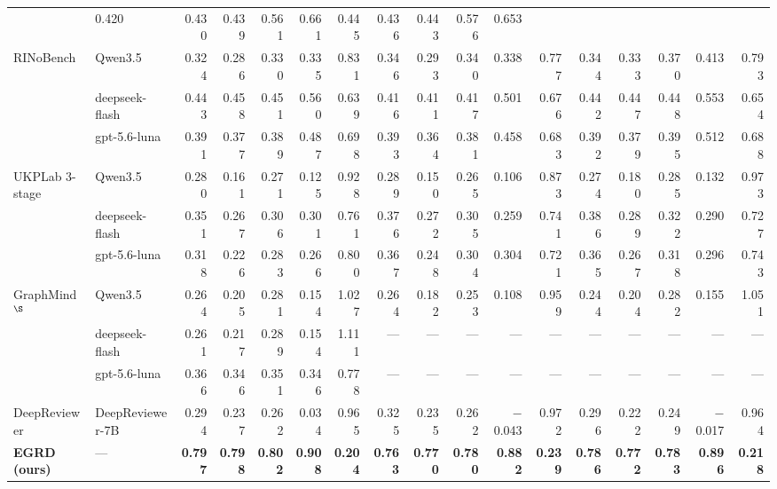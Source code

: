 \begin{table}[t]
{\begin{tabular}{@{}ll rrrrr rrrrr rrrrr@{}}
& 0.420 & 0.430 & 0.439 & 0.561 & 0.661
& 0.445 & 0.436 & 0.443 & 0.576 & 0.653 \\
\addlinespace
RINoBench & Qwen3.5
& 0.324 & 0.286 & 0.330 & 0.335 & 0.831
& 0.346 & 0.293 & 0.340 & 0.338 & 0.777
& 0.344 & 0.333 & 0.370 & 0.413 & 0.793 \\
& deepseek-flash
& 0.443 & 0.458 & 0.451 & 0.560 & 0.639
& 0.416 & 0.411 & 0.417 & 0.501 & 0.676
& 0.442 & 0.447 & 0.448 & 0.553 & 0.654 \\
& gpt-5.6-luna
& 0.391 & 0.377 & 0.389 & 0.487 & 0.698
& 0.393 & 0.364 & 0.381 & 0.458 & 0.683
& 0.392 & 0.379 & 0.395 & 0.512 & 0.688 \\
\addlinespace
UKPLab 3-stage & Qwen3.5
& 0.280 & 0.161 & 0.271 & 0.125 & 0.928
& 0.289 & 0.150 & 0.265 & 0.106 & 0.873
& 0.274 & 0.180 & 0.285 & 0.132 & 0.973 \\
& deepseek-flash
& 0.351 & 0.267 & 0.306 & 0.301 & 0.761
& 0.376 & 0.272 & 0.305 & 0.259 & 0.741
& 0.386 & 0.289 & 0.322 & 0.290 & 0.727 \\
& gpt-5.6-luna
& 0.318 & 0.226 & 0.283 & 0.266 & 0.800
& 0.367 & 0.248 & 0.304 & 0.304 & 0.721
& 0.365 & 0.267 & 0.318 & 0.296 & 0.743 \\
\addlinespace
GraphMind$^{\S}$ & Qwen3.5
& 0.264 & 0.205 & 0.281 & 0.154 & 1.027
& 0.264 & 0.182 & 0.253 & 0.108 & 0.959
& 0.244 & 0.204 & 0.282 & 0.155 & 1.051 \\
& deepseek-flash
& 0.261 & 0.217 & 0.289 & 0.154 & 1.111
& --- & --- & --- & --- & ---
& --- & --- & --- & --- & --- \\
& gpt-5.6-luna
& 0.366 & 0.346 & 0.351 & 0.346 & 0.778
& --- & --- & --- & --- & ---
& --- & --- & --- & --- & --- \\
\addlinespace
DeepReviewer & DeepReviewer-7B
& 0.294 & 0.237 & 0.262 & 0.034 & 0.965
& 0.325 & 0.235 & 0.262 & $-$0.043 & 0.972
& 0.296 & 0.222 & 0.249 & $-$0.017 & 0.964 \\
\addlinespace
\textbf{EGRD (ours)} & ---
& \textbf{0.797} & \textbf{0.798} & \textbf{0.802} & \textbf{0.908} & \textbf{0.204}
& \textbf{0.763} & \textbf{0.770} & \textbf{0.780} & \textbf{0.882} & \textbf{0.239}
& \textbf{0.786} & \textbf{0.772} & \textbf{0.783} & \textbf{0.896} & \textbf{0.218} \\
\bottomrule
\end{tabular}}
\end{table}

